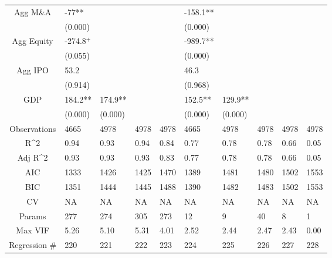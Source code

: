 \documentclass{article}
\begin{document}
\begin{table}[H]
\begin{tabular}{|clllllllll|}
  Agg M\&A & -77** &  &  &  & -158.1** &  &  &  &  \\ 
   & (0.000) &  &  &  & (0.000) &  &  &  &  \\ 
  Agg Equity & -274.8$^{+}$ &  &  &  & -989.7** &  &  &  &  \\ 
   & (0.055) &  &  &  & (0.000) &  &  &  &  \\ 
  Agg IPO & 53.2 &  &  &  & 46.3 &  &  &  &  \\ 
   & (0.914) &  &  &  & (0.968) &  &  &  &  \\ 
  GDP & 184.2** & 174.9** &  &  & 152.5** & 129.9** &  &  &  \\ 
   & (0.000) & (0.000) &  &  & (0.000) & (0.000) &  &  &  \\ 
  \hline 
 Observations & 4665 & 4978 & 4978 & 4978 & 4665 & 4978 & 4978 & 4978 & 4978 \\ 
  R^2 & 0.94 & 0.93 & 0.94 & 0.84 & 0.77 & 0.78 & 0.78 & 0.66 & 0.05 \\ 
  Adj R^2 & 0.93 & 0.93 & 0.93 & 0.83 & 0.77 & 0.78 & 0.78 & 0.66 & 0.05 \\ 
  AIC & 1333 & 1426 & 1425 & 1470 & 1389 & 1481 & 1480 & 1502 & 1553 \\ 
  BIC & 1351 & 1444 & 1445 & 1488 & 1390 & 1482 & 1483 & 1502 & 1553 \\ 
  CV & NA & NA & NA & NA & NA & NA & NA & NA & NA \\ 
  Params & 277 & 274 & 305 & 273 & 12 & 9 & 40 & 8 & 1 \\ 
  Max VIF & 5.26 & 5.10 & 5.31 & 4.01 & 2.52 & 2.44 & 2.47 & 2.43 & 0.00 \\ 
  Regression \# & 220 & 221 & 222 & 223 & 224 & 225 & 226 & 227 & 228 \\ 
   \hline
\end{tabular}
 
\end{table}
\end{document}
